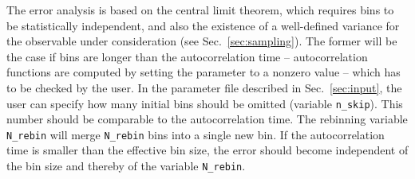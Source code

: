 %
The error analysis is based on the central limit theorem, which requires bins to be statistically independent, and also the existence of a well-defined variance for the observable under consideration (see Sec.~\ref{sec:sampling}).
The former will be the case if bins are  longer than the autocorrelation time -- autocorrelation functions are computed by setting the parameter  to a nonzero value -- which has to be checked by the user.  In the parameter file described in Sec.~\ref{sec:input}, the user  can specify how many initial bins should be omitted (variable \texttt{n\_skip}). This number should be comparable to the autocorrelation time.
The  rebinning  variable \texttt{N\_rebin} will merge \texttt{N\_rebin}  bins into a single new bin. 
If the autocorrelation time  is smaller than the effective bin size, the error should become independent of the bin size and thereby of the variable \texttt{N\_rebin}.
%
